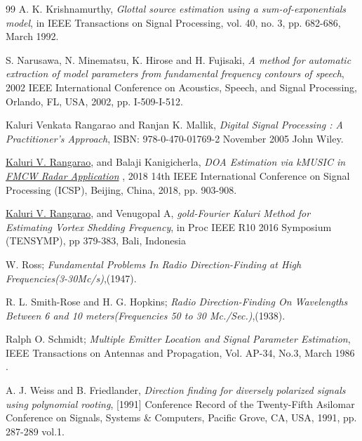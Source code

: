 \begin{thebibliography}{99}
A. K. Krishnamurthy, {\em Glottal source estimation using a sum-of-exponentials model}, in IEEE Transactions on Signal Processing, vol. 40, no. 3, pp. 682-686, March 1992.

S. Narusawa, N. Minematsu, K. Hirose and H. Fujisaki, {\em A method for automatic extraction of model parameters from fundamental frequency contours of speech}, 2002 IEEE International Conference on Acoustics, Speech, and Signal Processing, Orlando, FL, USA, 2002, pp. I-509-I-512.	

Kaluri Venkata Rangarao and Ranjan K. Mallik, {\em Digital Signal Processing : A Practitioner's Approach}, ISBN: 978-0-470-01769-2 November 2005 John Wiley.

{\href{https://ieeexplore.ieee.org/document/8652394}
	{Kaluri V. Rangarao},  
	and Balaji Kanigicherla, {\em DOA Estimation via kMUSIC in 
		\href{https://events.vtools.ieee.org/m/175360}		{FMCW Radar Application}
	}, 2018 14th IEEE International Conference on Signal Processing (ICSP), Beijing, China, 2018, pp. 903-908.}

{\href{http://ieeexplore.ieee.org/document/7519436/}
	{Kaluri V. Rangarao},  and Venugopal A, {\em gold-Fourier Kaluri Method for Estimating Vortex Shedding Frequency}, in Proc IEEE R10 2016 Symposium (TENSYMP), pp 379-383, Bali, Indonesia}
	
	

W. Ross;
{\em Fundamental Problems In Radio Direction-Finding at High Frequencies(3-30Mc/s)},(1947).

R. L. Smith-Rose and H. G. Hopkins; 
{\em Radio Direction-Finding On Wavelengths Between 6 and 10 meters(Frequencies 50 to 30 Mc./Sec.)},(1938).

Ralph O. Schmidt;
{\em Multiple Emitter Location and Signal Parameter Estimation},
IEEE Transactions on Antennas and Propagation, Vol. AP-34, No.3, March 1986
.

A. J. Weiss and B. Friedlander, 
{\em Direction finding for diversely polarized signals using polynomial rooting}, [1991] Conference Record of the Twenty-Fifth Asilomar Conference on Signals, Systems \& Computers, Pacific Grove, CA, USA, 1991, pp. 287-289 vol.1. 	


\end{thebibliography}

